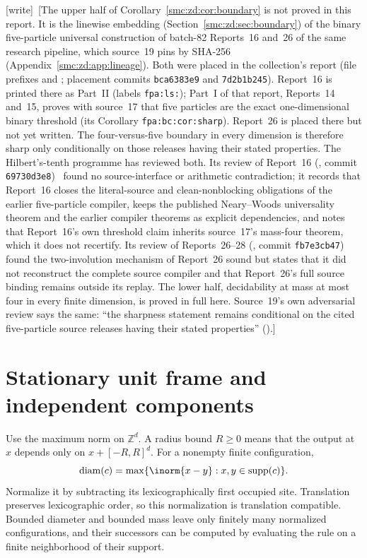 \documentclass[11pt,letterpaper]{article}
\numberwithin{equation}{section}
\theoremstyle{definition}
\theoremstyle{remark}
\newcommand{\Z}{\mathbb Z}
\newcommand{\wtag}{\textup{[write]}}
\newcommand{\supp}{\operatorname{supp}}
\newcommand{\diam}{\operatorname{diam}}
\begin{document}
\wtag\ [The upper half of Corollary~\ref{smc:zd:cor:boundary} is not proved in this report. It is the linewise embedding (Section~\ref{smc:zd:sec:boundary}) of the binary five-particle universal construction of batch-82 Reports~16 and~26 of the same research pipeline, which source~19 pins by SHA-256 (Appendix~\ref{smc:zd:app:lineage}). Both were placed in the collection's report  (file prefixes  and ; placement commits \texttt{bca6383e9} and \texttt{7d2b1b245}). Report~16 is printed there as Part~II (labels \texttt{fpa:ls:}); Part~I of that report, Reports~14 and~15, proves with source~17 that five particles are the exact one-dimensional binary threshold (its Corollary \texttt{fpa:bc:cor:sharp}). Report~26 is placed there but not yet written. The four-versus-five boundary in every dimension is therefore sharp only conditionally on those releases having their stated properties. The Hilbert's-tenth programme has reviewed both. Its review of Report~16 (, commit \texttt{69730d3e8})~\cite{reviewsource16} found no source-interface or arithmetic contradiction; it records that Report~16 closes the literal-source and clean-nonblocking obligations of the earlier five-particle compiler, keeps the published Neary--Woods universality theorem and the earlier compiler theorems as explicit dependencies, and notes that Report~16's own threshold claim inherits source~17's mass-four theorem, which it does not recertify. Its review of Reports~26--28 (, commit \texttt{fb7e3cb47})~\cite{reviewparallel} found the two-involution mechanism of Report~26 sound but states that it did not reconstruct the complete source compiler and that Report~26's full source binding remains outside its replay. The lower half, decidability at mass at most four in every finite dimension, is proved in full here. Source~19's own adversarial review says the same: ``the sharpness statement remains conditional on the cited five-particle source releases having their stated properties'' ().]

\section{Stationary unit frame and independent components}\label{smc:zd:sec:frame}
Use the maximum norm on $\Z^d$. A radius bound $R\ge0$ means that the output at $x$ depends only on $x+[-R,R]^d$. For a nonempty finite configuration,
\[
 \diam(c)=\max\{\inorm{x-y}:x,y\in\supp(c)\}.
\]
Normalize it by subtracting its lexicographically first occupied site. Translation preserves lexicographic order, so this normalization is translation compatible. Bounded diameter and bounded mass leave only finitely many normalized configurations, and their successors can be computed by evaluating the rule on a finite neighborhood of their support.
\end{document}
